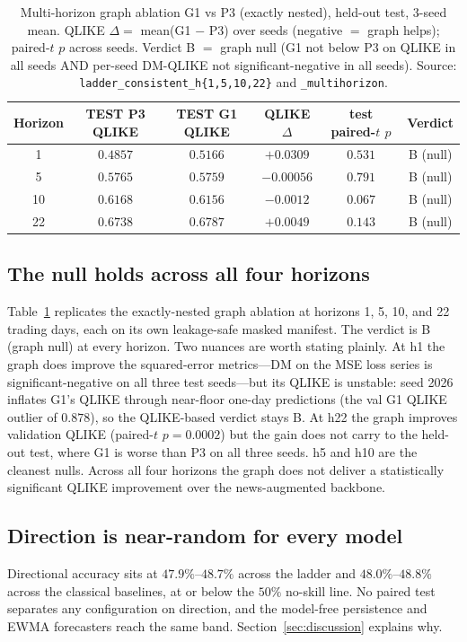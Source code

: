 \documentclass[runningheads]{llncs}
\newcommand{\nseed}{3}
\begin{document}
\begin{table}[t]
\caption{Multi-horizon graph ablation G1 vs P3 (exactly nested), held-out test, \nseed-seed mean. QLIKE
$\Delta=$ mean(G1 $-$ P3) over seeds (negative $=$ graph helps); paired-$t$ $p$ across seeds. Verdict B $=$
graph null (G1 not below P3 on QLIKE in all seeds AND per-seed DM-QLIKE not significant-negative in all
seeds). Source: \texttt{ladder\_consistent\_h\{1,5,10,22\}} and \texttt{\_multihorizon}.}
\label{tab:graph}
\centering
\begin{tabular}{cccccc}
\toprule
Horizon & TEST P3 QLIKE & TEST G1 QLIKE & QLIKE $\Delta$ & test paired-$t$ $p$ & Verdict \\
\midrule
1  & $0.4857$ & $0.5166$ & $+0.0309$  & $0.531$ & B (null) \\
5  & $0.5765$ & $0.5759$ & $-0.00056$ & $0.791$ & B (null) \\
10 & $0.6168$ & $0.6156$ & $-0.0012$  & $0.067$ & B (null) \\
22 & $0.6738$ & $0.6787$ & $+0.0049$  & $0.143$ & B (null) \\
\bottomrule
\end{tabular}
\end{table}

\subsection{The null holds across all four horizons}
\label{sec:multihorizon}
Table~\ref{tab:graph} replicates the exactly-nested graph ablation at horizons 1, 5, 10, and 22 trading
days, each on its own leakage-safe masked manifest. The verdict is B (graph null) at every horizon. Two
nuances are worth stating plainly. At h1 the graph does improve the squared-error metrics---DM on the MSE
loss series is significant-negative on all three test seeds---but its QLIKE is unstable: seed 2026 inflates
G1's QLIKE through near-floor one-day predictions (the val G1 QLIKE outlier of $0.878$), so the
QLIKE-based verdict stays B. At h22 the graph improves validation QLIKE (paired-$t$ $p=0.0002$) but the
gain does not carry to the held-out test, where G1 is worse than P3 on all three seeds. h5 and h10 are the
cleanest nulls. Across all four horizons the graph does not deliver a statistically significant QLIKE
improvement over the news-augmented backbone.

\subsection{Direction is near-random for every model}
\label{sec:direction}
Directional accuracy sits at $47.9\%$--$48.7\%$ across the ladder and $48.0\%$--$48.8\%$ across the
classical baselines, at or below the $50\%$ no-skill line. No paired test separates any configuration on
direction, and the model-free persistence and EWMA forecasters reach the same band.
Section~\ref{sec:discussion} explains why.
\end{document}
